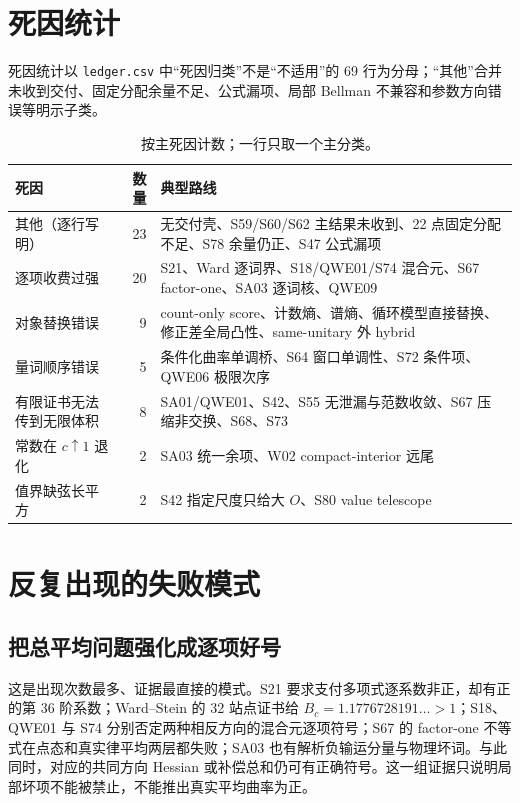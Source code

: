 \documentclass[UTF8,11pt]{ctexart}
\newcommand{\code}[1]{\texttt{#1}}
\begin{document}
\section{死因统计}

死因统计以 \code{ledger.csv} 中“死因归类”不是“不适用”的 69 行为分母；“其他”合并未收到交付、固定分配余量不足、公式漏项、局部 Bellman 不兼容和参数方向错误等明示子类。

\begin{table}[H]
\centering
\begin{tabular}{lrp{7.4cm}}
\toprule
死因 & 数量 & 典型路线\\
\midrule
其他（逐行写明） & 23 & 无交付壳、S59/S60/S62 主结果未收到、22 点固定分配不足、S78 余量仍正、S47 公式漏项\\
逐项收费过强 & 20 & S21、Ward 逐词界、S18/QWE01/S74 混合元、S67 factor-one、SA03 逐词核、QWE09\\
对象替换错误 & 9 & count-only score、计数熵、谱熵、循环模型直接替换、修正差全局凸性、same-unitary 外 hybrid\\
量词顺序错误 & 5 & 条件化曲率单调桥、S64 窗口单调性、S72 条件项、QWE06 极限次序\\
有限证书无法传到无限体积 & 8 & SA01/QWE01、S42、S55 无泄漏与范数收敛、S67 压缩非交换、S68、S73\\
常数在 $c\uparrow1$ 退化 & 2 & SA03 统一余项、W02 compact-interior 远尾\\
值界缺弦长平方 & 2 & S42 指定尺度只给大 $O$、S80 value telescope\\
\bottomrule
\end{tabular}
\caption{按主死因计数；一行只取一个主分类。}
\end{table}

\section{反复出现的失败模式}

\subsection{把总平均问题强化成逐项好号}

这是出现次数最多、证据最直接的模式。S21 要求支付多项式逐系数非正，却有正的第 36 阶系数；Ward--Stein 的 32 站点证书给 $B_c=1.1776728191\ldots>1$；S18、QWE01 与 S74 分别否定两种相反方向的混合元逐项符号；S67 的 factor-one 不等式在点态和真实律平均两层都失败；SA03 也有解析负输运分量与物理坏词。与此同时，对应的共同方向 Hessian 或补偿总和仍可有正确符号。这一组证据只说明局部坏项不能被禁止，不能推出真实平均曲率为正。
\end{document}
